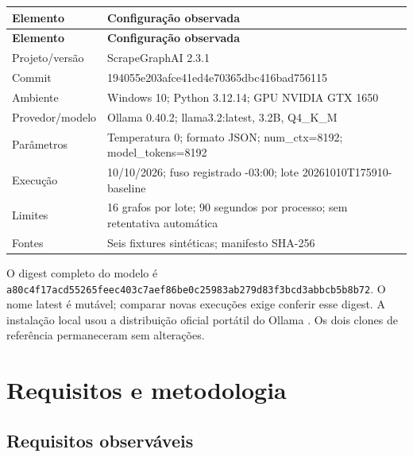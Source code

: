 \documentclass[a4paper,12pt]{article}
\newcommand{\arquivo}[1]{\nolinkurl{#1}}
\begin{document}
\begingroup\small\setlength{\tabcolsep}{4pt}
\begin{longtable}{@{}p{3.5cm}p{11.2cm}@{}}
\toprule
\textbf{Elemento} & \textbf{Configuração observada} \\
\midrule\endfirsthead
\toprule
\textbf{Elemento} & \textbf{Configuração observada} \\
\midrule\endhead
\bottomrule\endfoot
Projeto/versão & ScrapeGraphAI 2.3.1 \\
Commit & 194055e203afce41ed4e70365dbc416bad756115 \\
Ambiente & Windows 10; Python 3.12.14; GPU NVIDIA GTX 1650 \\
Provedor/modelo & Ollama 0.40.2; llama3.2:latest, 3.2B, Q4\_K\_M \\
Parâmetros & Temperatura 0; formato JSON; num\_ctx=8192; model\_tokens=8192 \\
Execução & 10/10/2026; fuso registrado -03:00; lote 20261010T175910-baseline \\
Limites & 16 grafos por lote; 90 segundos por processo; sem retentativa automática \\
Fontes & Seis fixtures sintéticas; manifesto SHA-256 \\
\end{longtable}\endgroup
O digest completo do modelo é \arquivo{a80c4f17acd55265feec403c7aef86be0c25983ab279d83f3bcd3abbcb5b8b72}. O nome latest é mutável; comparar novas execuções exige conferir esse digest. A instalação local usou a distribuição oficial portátil do Ollama \cite{ollama}. Os dois clones de referência permaneceram sem alterações.

\section{Requisitos e metodologia}
\subsection{Requisitos observáveis}
\end{document}
